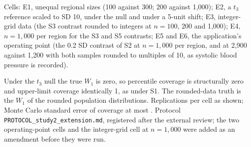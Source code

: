 \documentclass[AMA,Times1COL]{WileyNJDv5}
\begin{document}
\begin{table}[ht]
\centering
\caption{Registered extension of Study 2: unequal regional sizes, a $t_3$ reference distribution, integer-grid data, $n = 1{,}000$ per region and the application's operating point (0.2 SD). Bias, RMSE and mean width in the original units; coverage of the 95\% percentile interval and of its one-sided 97.5\% upper limit.\label{tab:study2_ext}}
\begin{tablenotes}
\item Cells: E1, unequal regional sizes (100 against 300; 200 against 1{,}000); E2, a $t_3$ reference scaled to SD 10, under the null and under a 5-unit shift; E3, integer-grid data (the S3 contrast rounded to integers at $n = 100$, 200 and 1{,}000); E4, $n = 1{,}000$ per region for the S3 and S5 contrasts; E5 and E6, the application's operating point (the 0.2 SD contrast of S2 at $n = 1{,}000$ per region, and at 2{,}900 against 1{,}200 with both samples rounded to multiples of 10, as systolic blood pressure is recorded).
\item Under the $t_3$ null the true $W_1$ is zero, so percentile coverage is structurally zero and upper-limit coverage identically 1, as under S1. The rounded-data truth is the $W_1$ of the rounded population distributions. Replications per cell as shown; Monte Carlo standard error of coverage at most . Protocol \texttt{PROTOCOL\_study2\_extension.md}, registered after the external review; the two operating-point cells and the integer-grid cell at $n = 1{,}000$ were added as an amendment before they were run.
\end{tablenotes}
\end{table}
\end{document}
